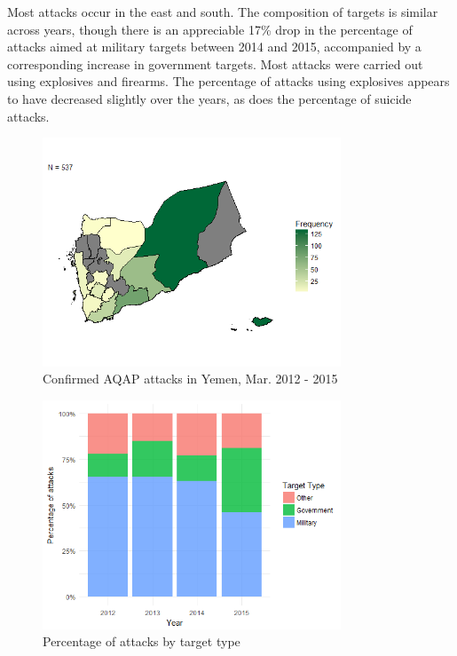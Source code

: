 \documentclass[letterpaper,12pt]{article}
\theoremstyle{definition}
\begin{document}
Most attacks occur in the east and south. The composition of targets is similar across years, though there is an appreciable 17\% drop in the percentage of attacks aimed at military targets between 2014 and 2015, accompanied by a corresponding increase in government targets. Most attacks were carried out using explosives and firearms. The percentage of attacks using explosives appears to have decreased slightly over the years, as does the percentage of suicide attacks.

\newpage
\begin{figure}[htb!]
\begin{center}
\caption {Confirmed AQAP attacks in Yemen, Mar. 2012 - 2015}
  \includegraphics[width=3.5in]{attack_map.png}
\end{center}
\end{figure}

\begin{figure}[htb!]
\begin{center}
\caption {Percentage of attacks by target type}
  \includegraphics[width=3.5in]{attack_target.png}
\end{center}
\end{figure}
\end{document}
